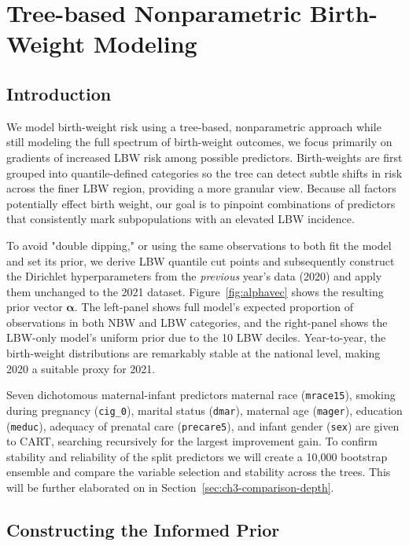 \chapter{Tree-based Nonparametric Birth-Weight Modeling}
\label{chap:chapter3-title}

\section{Introduction}
\label{sec:ch3-introduction}
We model birth-weight risk using a tree-based, nonparametric approach while still modeling the full spectrum of birth-weight outcomes, we focus primarily on gradients of increased LBW risk among possible predictors. Birth-weights are first grouped into quantile-defined categories so the tree can detect subtle shifts in risk across the finer LBW region, providing a more granular view. Because all factors potentially effect birth weight, our goal is to pinpoint combinations of predictors that consistently mark subpopulations with an elevated LBW incidence. 

To avoid "double dipping," or using the same observations to both fit the model and set its prior, we derive LBW quantile cut points and subsequently construct the Dirichlet hyperparameters from the \emph{previous} year's data (2020) and apply them unchanged to the 2021 dataset. Figure~\ref{fig:alphavec} shows the resulting prior vector \(\boldsymbol\alpha\). The left-panel shows full model's expected proportion of observations in both NBW and LBW categories, and the right-panel shows the LBW-only model's uniform prior due to the 10 LBW deciles. Year-to-year, the birth-weight distributions are remarkably stable at the national level, making 2020 a suitable proxy for 2021.

Seven dichotomous maternal-infant predictors maternal race (\texttt{mrace15}), smoking during pregnancy (\texttt{cig\_0}), marital status (\texttt{dmar}), maternal age (\texttt{mager}), education (\texttt{meduc}), adequacy of prenatal care (\texttt{precare5}), and infant gender (\texttt{sex}) are given to CART, searching recursively for the largest improvement gain. To confirm stability and reliability of the split predictors we will create a 10,000 bootstrap ensemble and compare the variable selection and stability across the trees. This will be further elaborated on in Section~\ref{sec:ch3-comparison-depth}. 

\section{Constructing the Informed Prior}
\label{sec:ch3-prior}

